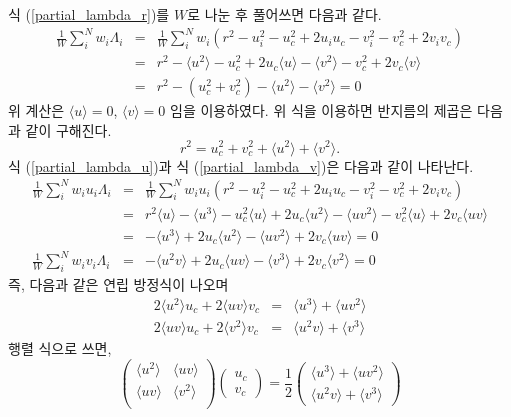 \documentclass[chapter,a4paper,10pt]{oblivoir}
\begin{document}
식 (\ref{partial_lambda_r})를 $W$로 나눈 후 풀어쓰면 다음과 같다.
\begin{eqnarray}
\frac{1}{W}\sum_i^Nw_i\Lambda_i &=& \frac{1}{W}\sum_i^Nw_i \left(r^2 - u_i^2 - u_c^2 + 2u_iu_c - v_i^2 - v_c^2 + 2v_iv_c\right) \\
&=& r^2 - \langle u^2\rangle - u_c^2 + 2u_c\langle u \rangle - \langle v^2 \rangle - v_c^2 + 2v_c\langle v\rangle\nonumber\\
&=& r^2 - (u_c^2+v_c^2) - \langle u^2\rangle - \langle v^2 \rangle = 0 \nonumber
\end{eqnarray}
위 계산은 $\langle u \rangle = 0$, $\langle v \rangle = 0$ 임을 이용하였다. 위 식을 이용하면 반지름의 제곱은 다음과 같이 구해진다.
\begin{equation}
r^2 = u_c^2+v_c^2 + \langle u^2\rangle + \langle v^2\rangle.
\end{equation}
식 (\ref{partial_lambda_u})과 식 (\ref{partial_lambda_v})은 다음과 같이 나타난다.
\begin{eqnarray}
\frac{1}{W}\sum_i^Nw_iu_i\Lambda_i &=& \frac{1}{W}\sum_i^Nw_iu_i \left(r^2 - u_i^2 - u_c^2 + 2u_iu_c - v_i^2 - v_c^2 + 2v_iv_c\right)  \\
&=& r^2\langle u \rangle - \langle u^3\rangle - u_c^2\langle u \rangle + 2u_c\langle u^2 \rangle - \langle uv^2 \rangle - v_c^2\langle u \rangle + 2v_c\langle uv\rangle \nonumber\\
&=& - \langle u^3\rangle + 2u_c\langle u^2 \rangle - \langle uv^2 \rangle + 2v_c\langle uv\rangle = 0\nonumber\\
\frac{1}{W}\sum_i^Nw_iv_i\Lambda_i &=& - \langle u^2v\rangle + 2u_c\langle uv \rangle - \langle v^3 \rangle + 2v_c\langle v^2\rangle = 0
\end{eqnarray}
즉, 다음과 같은 연립 방정식이 나오며
\begin{eqnarray}
2\langle u^2 \rangle u_c + 2\langle uv  \rangle v_c &=& \langle u^3\rangle + \langle uv^2 \rangle \\
2\langle uv  \rangle u_c + 2\langle v^2 \rangle v_c &=& \langle u^2v\rangle + \langle v^3 \rangle
\end{eqnarray}
행렬 식으로 쓰면,
\begin{equation}
\left( \begin{array}{cc}
  \langle u^2 \rangle & \langle uv  \rangle \\
  \langle uv  \rangle & \langle v^2 \rangle \\
\end{array} \right)
\left( \begin{array}{ll}
  u_c \\
  v_c
\end{array} \right)
= \frac{1}{2}
\left( \begin{array}{ll}
  \langle u^3\rangle + \langle uv^2 \rangle \\
  \langle u^2v\rangle + \langle v^3 \rangle
\end{array} \right)
\end{equation}
\end{document}
